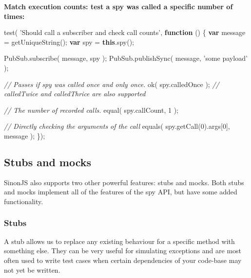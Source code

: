 \documentclass[9pt]{book}
\newenvironment{Shaded}{}{}
\newcommand{\KeywordTok}[1]{\textcolor[rgb]{0.00,0.44,0.13}{\textbf{{#1}}}}
\newcommand{\DecValTok}[1]{\textcolor[rgb]{0.25,0.63,0.44}{{#1}}}
\newcommand{\StringTok}[1]{\textcolor[rgb]{0.25,0.44,0.63}{{#1}}}
\newcommand{\CommentTok}[1]{\textcolor[rgb]{0.38,0.63,0.69}{\textit{{#1}}}}
\newcommand{\OtherTok}[1]{\textcolor[rgb]{0.00,0.44,0.13}{{#1}}}
\newcommand{\FunctionTok}[1]{\textcolor[rgb]{0.02,0.16,0.49}{{#1}}}
\newcommand{\NormalTok}[1]{{#1}}
\begin{document}
\textbf{Match execution counts: test a spy was called a specific number
of times:}

\begin{Shaded}
\begin{Highlighting}[]
\FunctionTok{test}\NormalTok{( }\StringTok{'Should call a subscriber and check call counts'}\NormalTok{, }\KeywordTok{function} \NormalTok{() \{}
    \KeywordTok{var} \NormalTok{message = }\FunctionTok{getUniqueString}\NormalTok{();}
    \KeywordTok{var} \NormalTok{spy = }\KeywordTok{this}\NormalTok{.}\FunctionTok{spy}\NormalTok{();}

    \OtherTok{PubSub}\NormalTok{.}\FunctionTok{subscribe}\NormalTok{( message, spy );}
    \OtherTok{PubSub}\NormalTok{.}\FunctionTok{publishSync}\NormalTok{( message, }\StringTok{'some payload'} \NormalTok{);}


    \CommentTok{// Passes if spy was called once and only once.}
    \FunctionTok{ok}\NormalTok{( }\OtherTok{spy}\NormalTok{.}\FunctionTok{calledOnce} \NormalTok{); }\CommentTok{// calledTwice and calledThrice are also supported}

    \CommentTok{// The number of recorded calls.}
    \FunctionTok{equal}\NormalTok{( }\OtherTok{spy}\NormalTok{.}\FunctionTok{callCount}\NormalTok{, }\DecValTok{1} \NormalTok{);}

    \CommentTok{// Directly checking the arguments of the call}
    \FunctionTok{equals}\NormalTok{( }\OtherTok{spy}\NormalTok{.}\FunctionTok{getCall}\NormalTok{(}\DecValTok{0}\NormalTok{).}\FunctionTok{args}\NormalTok{[}\DecValTok{0}\NormalTok{], message );}
\NormalTok{\});}
\end{Highlighting}
\end{Shaded}

\subsection{Stubs and mocks}\label{stubs-and-mocks}

SinonJS also supports two other powerful features: stubs and mocks. Both
stubs and mocks implement all of the features of the spy API, but have
some added functionality.

\subsubsection{Stubs}\label{stubs}

A stub allows us to replace any existing behaviour for a specific method
with something else. They can be very useful for simulating exceptions
and are most often used to write test cases when certain dependencies of
your code-base may not yet be written.
\end{document}
